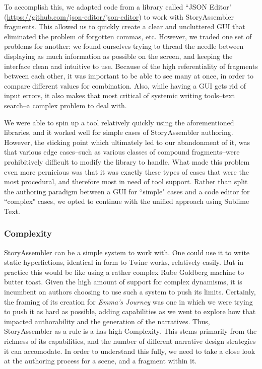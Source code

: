 To accomplish this, we adapted code from a library called ``JSON Editor" (\url{https://github.com/json-editor/json-editor}) to work with StoryAssembler fragments. This allowed us to quickly create a clear and uncluttered GUI that eliminated the problem of forgotten commas, etc. However, we traded one set of problems for another: we found ourselves trying to thread the needle between displaying as much information as possible on the screen, and keeping the interface clean and intuitive to use. Because of the high referentiality of fragments between each other, it was important to be able to see many at once, in order to compare different values for combination. Also, while having a GUI gets rid of input errors, it also makes that most critical of systemic writing tools--text search--a complex problem to deal with.

We were able to spin up a tool relatively quickly using the aforementioned libraries, and it worked well for simple cases of StoryAssembler authoring. However, the sticking point which ultimately led to our abandonment of it, was that various edge cases--such as various classes of compound fragments--were prohibitively difficult to modify the library to handle. What made this problem even more pernicious was that it was exactly these types of cases that were the most procedural, and therefore most in need of tool support. Rather than split the authoring paradigm between a GUI for ``simple" cases and a code editor for ``complex" cases, we opted to continue with the unified approach using Sublime Text.

\subsubsection{Complexity}
\label{complexity}

StoryAssembler can be a simple system to work with. One could use it to write static hyperfictions, identical in form to Twine works, relatively easily. But in practice this would be like using a rather complex Rube Goldberg machine to butter toast. Given the high amount of support for complex dynamisms, it is incumbent on authors choosing to use such a system to push its limits. Certainly, the framing of its creation for \textit{Emma's Journey} was one in which we were trying to push it as hard as possible, adding capabilities as we went to explore how that impacted authorability and the generation of the narratives. Thus, StoryAssembler as a rule is a has high Complexity. This stems primarily from the richness of its capabilities, and the number of different narrative design strategies it can accomodate. In order to understand this fully, we need to take a close look at the authoring process for a scene, and a fragment within it.

